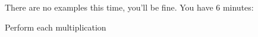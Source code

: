\begin{exercises}
    There are no examples this time, you'll be fine. You have 6 minutes:
    \begin{questions}
        \Question[7] Perform each multiplication
        \begin{multicols}{2}
\end{multicols}
\end{questions}
\end{exercises}
